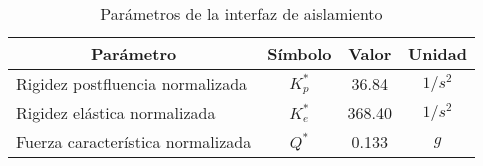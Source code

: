 \begin{table}[!ht]
	\centering
	\vspace{1.5 mm}
	\caption[Parámetros de la interfaz de aislamiento]{\centering\footnotesize Parámetros de la interfaz de aislamiento}
	\vspace{1 mm}
	\begin{tabular}{|l|c|c|c|}
		\hline
		\multicolumn{1}{|c|}{Parámetro}     & Símbolo     & Valor  & Unidad    \\ \hline
		Rigidez   postfluencia normalizada  & $K_{p}^{*}$ & 36.84  & $1/s^{2}$ \\ \hline
		Rigidez   elástica normalizada      & $K_{e}^{*}$ & 368.40 & $1/s^{2}$ \\ \hline
		Fuerza   característica normalizada & $Q^{*}$     & 0.133  & $g$       \\ \hline
	\end{tabular}
	\label{Ca3_Tabla1}
\end{table}

